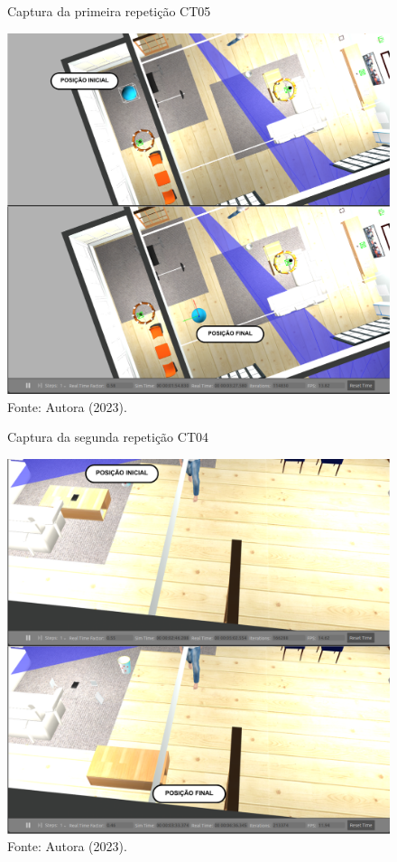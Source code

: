 \begin{figure}[H]
    \centering
    \caption{Captura da primeira repetição CT05}
    \includegraphics[scale=0.5]{ct05_1.png}
    \caption*{Fonte: Autora (2023).}
    \label{fig:ct05_1}
\end{figure}

\begin{figure}[H]
    \centering
    \caption{Captura da segunda repetição CT04}
    \includegraphics[scale=0.5]{ct05_2.png}
    \caption*{Fonte: Autora (2023).}
    \label{fig:ct05_2}
\end{figure}

